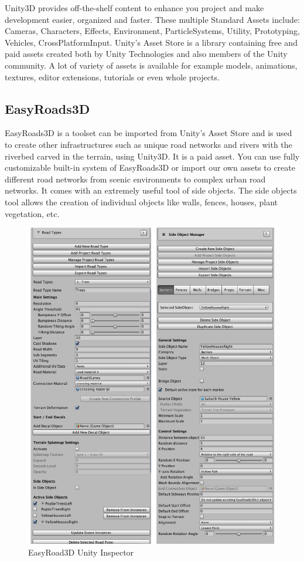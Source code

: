 \par
Unity3D\cite{unity3d} provides off-the-shelf content to enhance you project and make development easier, organized and faster. These multiple Standard Assets include: Cameras, Characters, Effects, Environment, ParticleSystems, Utility, Prototyping, Vehicles, CrossPlatformInput. Unity’s Asset Store is a library containing free and paid assets created both by Unity Technologies and also members of the Unity community. A lot of variety of assets is available for example models, animations, textures, editor extensions, tutorials or even whole projects.

\subsection{EasyRoads3D}\label{subsec:easyroad3d}
EasyRoads3D\cite{easyroads3d} is a toolset can be imported from Unity's Asset Store and is used to create other infrastructures such as unique road networks and rivers with the riverbed carved in the terrain, using Unity3D. It is a paid asset. You can use fully customizable built-in system of EasyRoads3D or import our own assets to create different road networks from scenic environments to complex urban road networks. It comes with an extremely useful tool of side objects. The side objects tool allows the creation of individual objects like walls, fences, houses, plant vegetation, etc.

\begin{figure}[H]
  \centering
  \includegraphics[scale=0.50]{images/Chapter4/easyroad3d.png}
  \caption{EasyRoad3D Unity Inspector}
  \label{fig:remote_ssh}
\end{figure}

